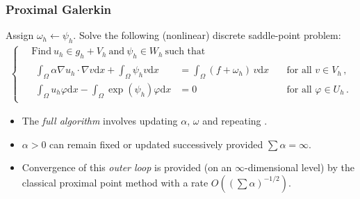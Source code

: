 \documentclass[aspectratio=169,xcolor=dvipsnames,11pt]{beamer}
\newcommand{\dd}{\mathrm{d}}
\newcommand{\fa}{\text{for all }}
\begin{document}
\begin{frame}\frametitle{Proximal Galerkin}{\tiny
\begin{algorithm2e}[H]
\DontPrintSemicolon
	\caption{\label{alg:EntropicGalerkinIntro} 	}
	\BlankLine
	\BlankLine
	{
		Assign $\omega_h \leftarrow \psi_{h}$.\;
		Solve the following (nonlinear) discrete saddle-point problem:  \vspace{-3ex}
		\begin{gather*}
			\left\{
			\begin{aligned}
				\,&\text{Find}~
				u_{h}\in g_h + V_{h} ~\text{and}~\psi_{h} \in W_{h}
				~\text{such that~}
				\\
				&\begin{alignedat}{4}
					\int_\Omega \alpha \nabla u_h\cdot \nabla v \dd x + \int_\Omega \psi_h v \dd x &= \int_\Omega (f + \omega_h)\, v \dd x
					&&~\fa v \in V_h
					\,,
					\\
					\int_\Omega u_h \varphi \dd x - \int_\Omega \exp(\psi_h) \varphi \dd x &= 0
					&&~\fa \varphi \in U_h 
					\,.
				\end{alignedat}
			\end{aligned}
			\right.
		\end{gather*}
		\;
		\vspace*{-\baselineskip} \vspace{-3ex}
	}
\end{algorithm2e}
}\pause
\begin{itemize}
\item The \textit{full algorithm} involves updating $\alpha$, $\omega$ and repeating .
\item $\alpha > 0$ can remain fixed or updated successively provided  $\sum \alpha = \infty$.
\item Convergence of this \textit{outer loop} is provided (on an $\infty$-dimensional level) by the classical proximal point method with a rate $O((\sum \alpha)^{-1/2})$.
\end{itemize}
\end{frame}
\end{document}

